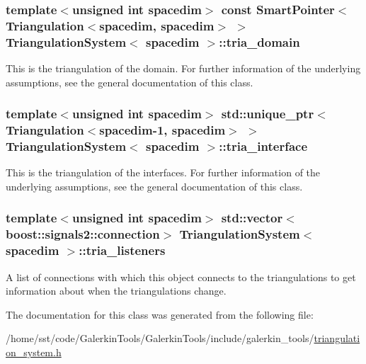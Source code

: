 \subsubsection[{\texorpdfstring{tria\+\_\+domain}{tria_domain}}]{\setlength{\rightskip}{0pt plus 5cm}template$<$unsigned int spacedim$>$ const {\bf Smart\+Pointer}$<${\bf Triangulation}$<$spacedim, spacedim$>$ $>$ {\bf Triangulation\+System}$<$ spacedim $>$\+::tria\+\_\+domain\hspace{0.3cm}{\ttfamily [protected]}}\hypertarget{class_triangulation_system_a68bafddc70652cb7c64701c74e86279f}{}\label{class_triangulation_system_a68bafddc70652cb7c64701c74e86279f}
This is the triangulation of the domain. For further information of the underlying assumptions, see the general documentation of this class. 
\subsubsection[{\texorpdfstring{tria\+\_\+interface}{tria_interface}}]{\setlength{\rightskip}{0pt plus 5cm}template$<$unsigned int spacedim$>$ std\+::unique\+\_\+ptr$<${\bf Triangulation}$<$spacedim-\/1, spacedim$>$ $>$ {\bf Triangulation\+System}$<$ spacedim $>$\+::tria\+\_\+interface\hspace{0.3cm}{\ttfamily [protected]}}\hypertarget{class_triangulation_system_af145fb3f6a3b3ef9ed92111f9fca5b7d}{}\label{class_triangulation_system_af145fb3f6a3b3ef9ed92111f9fca5b7d}
This is the triangulation of the interfaces. For further information of the underlying assumptions, see the general documentation of this class. 
\subsubsection[{\texorpdfstring{tria\+\_\+listeners}{tria_listeners}}]{\setlength{\rightskip}{0pt plus 5cm}template$<$unsigned int spacedim$>$ std\+::vector$<$boost\+::signals2\+::connection$>$ {\bf Triangulation\+System}$<$ spacedim $>$\+::tria\+\_\+listeners\hspace{0.3cm}{\ttfamily [private]}}\hypertarget{class_triangulation_system_a713f97bee5570de1f5571d86a41e83f6}{}\label{class_triangulation_system_a713f97bee5570de1f5571d86a41e83f6}
A list of connections with which this object connects to the triangulations to get information about when the triangulations change. 

The documentation for this class was generated from the following file\+:\begin{DoxyCompactItemize}
\item 
/home/sst/code/\+Galerkin\+Tools/\+Galerkin\+Tools/include/galerkin\+\_\+tools/\hyperlink{triangulation__system_8h}{triangulation\+\_\+system.\+h}\end{DoxyCompactItemize}
